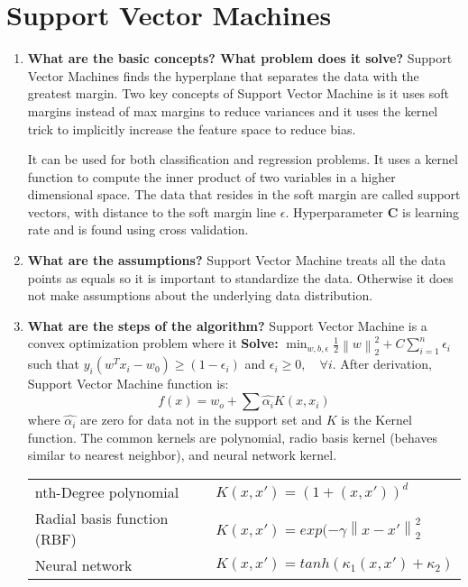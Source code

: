 \documentclass{article}
\begin{document}
\section{Support Vector Machines}
\noindent
\begin{enumerate}
    \item \textbf{What are the basic concepts? What problem does it solve?}
    \noindent 
    \smallbreak
    Support Vector Machines finds the hyperplane that separates the data with the greatest margin. Two key concepts of Support Vector Machine is it uses soft margins instead of max margins to reduce variances and it uses the kernel trick to implicitly increase the feature space to reduce bias. 
    
    It can be used for both classification and regression problems. It uses a kernel function to compute the inner product of two variables in a higher dimensional space. The data that resides in the soft margin are called support vectors, with distance to the soft margin line $\epsilon$. Hyperparameter \textbf{C} is learning rate and is found using cross validation.
    
    \item \textbf{What are the assumptions?}
    \noindent 
    \smallbreak
    Support Vector Machine treats all the data points as equals so it is important to standardize the data. Otherwise it does not make assumptions about the underlying data distribution.
    
    \item \textbf{What are the steps of the algorithm?}
    \noindent 
    \smallbreak
    Support Vector Machine is a convex optimization problem where it \textbf{Solve:} $\min_{w, b, \epsilon}\frac{1}{2}\left\|w\right\|_{2}^{2} + C\sum_{i=1}^{n} \epsilon_i$ such that $y_i(w^{T} x_i - w_0) \geq (1 - \epsilon_i)$ and $\epsilon_i \geq 0, \quad \forall i$. After derivation, Support Vector Machine function is:
    $$f(x) = w_o + \sum \hat{\alpha_i}K(x, x_i)$$
    where $\hat{\alpha_i}$ are zero for data not in the support set and $K$ is the Kernel function. The common kernels are polynomial, radio basis kernel (behaves similar to nearest neighbor), and neural network kernel. \cite{1}
    \begin{center}
      \begin{tabular}{ l l }
        \hline
        nth-Degree polynomial & $K(x,x') = (1 + (x, x'))^d$ \\
        Radial basis function (RBF) & $K(x, x') = exp(-\gamma\left\|x - x'\right\|_{2}^{2}$ \\ 
        Neural network & $K(x, x') = tanh(\kappa_1(x, x') + \kappa_2)$ \\ 
        \hline
      \end{tabular}
    \end{center}
    

\end{enumerate}
\end{document}
